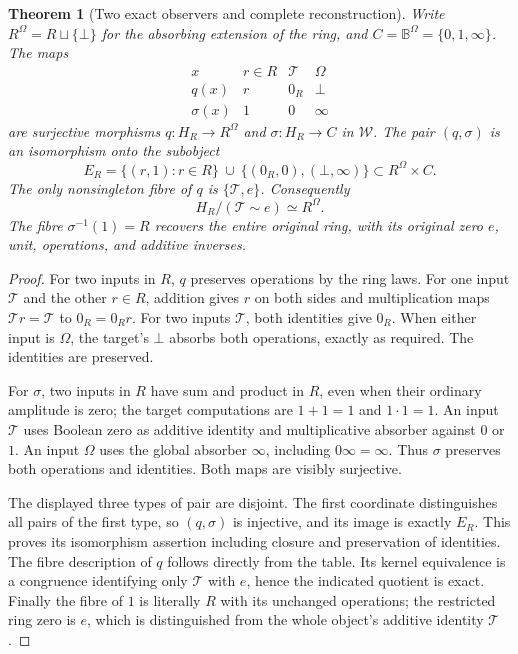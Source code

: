 \documentclass[11pt]{article}
\newtheorem{theorem}{Theorem}
\newcommand{\B}{\mathbb B}
\begin{document}
\begin{theorem}[Two exact observers and complete reconstruction]
Write $R^\Omega=R\sqcup\{\bot\}$ for the absorbing extension of the ring, and $C=\B^\Omega=\{0,1,\infty\}$. The maps
\[
\begin{array}{c|ccc}
x&r\in R&\mathcal T&\Omega\\\hline
q(x)&r&0_R&\bot\\
\sigma(x)&1&0&\infty
\end{array}
\]
are surjective morphisms $q:H_R\to R^\Omega$ and $\sigma:H_R\to C$ in $\mathcal W$. The pair $(q,\sigma)$ is an isomorphism onto the subobject
\[
E_R=\{(r,1):r\in R\}\ \cup\ \{(0_R,0),(\bot,\infty)\}
\subset R^\Omega\times C.
\]
The only nonsingleton fibre of $q$ is $\{\mathcal T,e\}$. Consequently
\[
H_R/(\mathcal T\sim e)\simeq R^\Omega.
\]
The fibre $\sigma^{-1}(1)=R$ recovers the entire original ring, with its original zero $e$, unit, operations, and additive inverses.
\end{theorem}
\begin{proof}
For two inputs in $R$, $q$ preserves operations by the ring laws. For one input $\mathcal T$ and the other $r\in R$, addition gives $r$ on both sides and multiplication maps $\mathcal T r=\mathcal T$ to $0_R=0_Rr$. For two inputs $\mathcal T$, both identities give $0_R$. When either input is $\Omega$, the target's $\bot$ absorbs both operations, exactly as required. The identities are preserved.

For $\sigma$, two inputs in $R$ have sum and product in $R$, even when their ordinary amplitude is zero; the target computations are $1+1=1$ and $1\cdot1=1$. An input $\mathcal T$ uses Boolean zero as additive identity and multiplicative absorber against $0$ or $1$. An input $\Omega$ uses the global absorber $\infty$, including $0\infty=\infty$. Thus $\sigma$ preserves both operations and identities. Both maps are visibly surjective.

The displayed three types of pair are disjoint. The first coordinate distinguishes all pairs of the first type, so $(q,\sigma)$ is injective, and its image is exactly $E_R$. This proves its isomorphism assertion including closure and preservation of identities. The fibre description of $q$ follows directly from the table. Its kernel equivalence is a congruence identifying only $\mathcal T$ with $e$, hence the indicated quotient is exact. Finally the fibre of $1$ is literally $R$ with its unchanged operations; the restricted ring zero is $e$, which is distinguished from the whole object's additive identity $\mathcal T$.
\end{proof}
\end{document}
